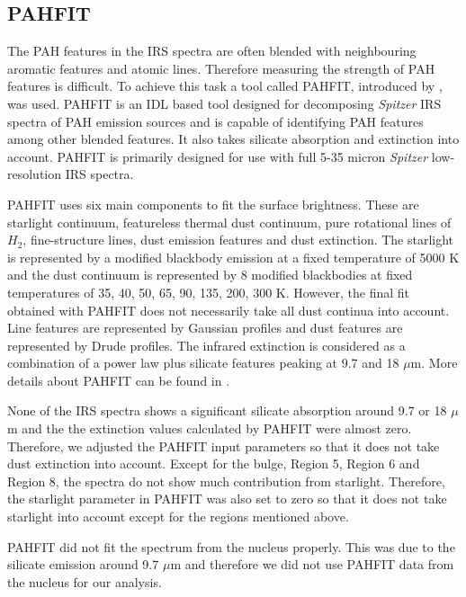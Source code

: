 \documentclass[useAMS,usenatbib,a4paper]{mn2e}
\begin{document}
\subsection{PAHFIT}

The PAH features in the IRS spectra are often blended with neighbouring aromatic features and atomic lines. Therefore measuring the strength of PAH features is difficult. To achieve this task a tool called PAHFIT, introduced by \citet{Smith:2007lr}, was used. PAHFIT is an IDL  based tool designed for decomposing {\em Spitzer} IRS spectra of PAH emission sources and is capable of identifying PAH features among other blended features. It also takes silicate absorption and extinction into account. PAHFIT is primarily designed for use with full 5-35 micron {\em Spitzer} low-resolution IRS spectra.

PAHFIT uses six main components to fit the surface brightness. These are starlight continuum, featureless thermal dust continuum, pure rotational lines of $H_2$, fine-structure lines, dust emission features and dust extinction. The starlight is represented by a modified blackbody emission at a fixed temperature of 5000 K and the dust continuum is represented by 8 modified blackbodies at fixed temperatures of 35, 40, 50, 65, 90, 135, 200, 300 K. However, the final fit obtained with PAHFIT does not necessarily take all dust continua into account. Line features are represented by Gaussian profiles and dust features are represented by Drude profiles. The infrared extinction is considered as a combination of a power law plus silicate features peaking at 9.7 and 18 $\mu$m. More details about PAHFIT can be found in \citet{Smith:2007lr}.

None of the IRS spectra shows a significant silicate absorption around 9.7 or 18 $\mu$m and the the extinction values calculated by PAHFIT were almost zero. Therefore, we adjusted the PAHFIT input parameters so that it does not take dust extinction into account. Except for the bulge, Region 5, Region 6 and Region 8, the spectra do not show much contribution from starlight. Therefore, the starlight parameter in PAHFIT was also set to zero so that it does not take starlight into account except for the regions mentioned above. 

PAHFIT did not fit the spectrum from the nucleus properly. This was due to the silicate emission around 9.7 $\mu$m and therefore we did not use PAHFIT data from the nucleus for our analysis.
\end{document}
